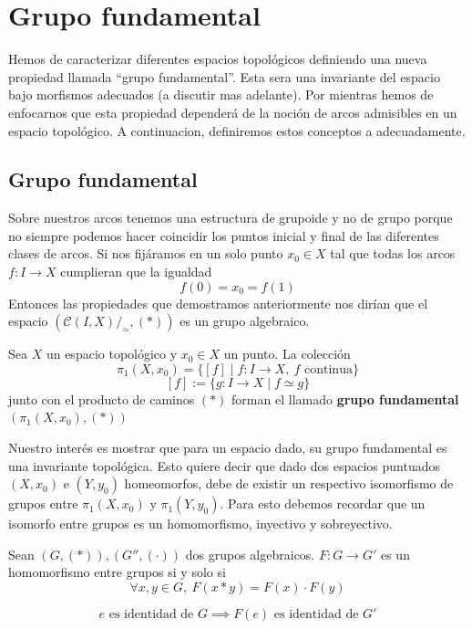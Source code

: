 \section{Grupo fundamental}
Hemos de caracterizar diferentes espacios topológicos definiendo una
nueva propiedad llamada ``grupo fundamental''. Esta sera una invariante
del espacio bajo morfismos adecuados (a discutir mas adelante). Por
mientras hemos de enfocarnos que esta propiedad dependerá de la noción
de arcos admisibles en un espacio topológico. A continuacion,
definiremos estos conceptos a adecuadamente.

{
\newcommand{\homRelAlt}{\stackrel{.}{\simeq}}



\subsection{Grupo fundamental}
Sobre nuestros arcos tenemos una estructura de grupoide y no de grupo
porque no siempre podemos hacer coincidir los puntos inicial y final de
las diferentes clases de arcos. Si nos fijáramos en un solo punto \(x_0
\in X\) tal que todas los arcos \(f : I \to X\) cumplieran que la igualdad
\[ f(0) = x_0 = f (1) \]
Entonces las propiedades que demostramos anteriormente nos dirían que el
espacio \((\mathcal C \left( I , X \right) / _\simeq , \left( *
\right))\) es un grupo algebraico.
\begin{definicion}
  Sea \(X\) un espacio topológico y \(x_0 \in X\) un punto. La colección
  \[ \pi_1 (X,x_0) = \{ [f] \mid f : I \to X,\ f \text{ continua}\}\]
  \[ [f] := \{ g : I \to X \mid f \simeq g\}\]
  junto con el producto de caminos \((*)\) forman el llamado
  \textbf{grupo fundamental} \((\pi_1(X,x_0), (*))\)
\end{definicion}

Nuestro interés es mostrar que para un espacio dado, su grupo
fundamental es una invariante topológica. Esto quiere decir que dado dos
espacios puntuados \((X,x_0)\) e \((Y,y_0)\) homeomorfos, debe de
existir un respectivo isomorfismo de grupos entre \(\pi_1(X,x_0)\) y
\(\pi_1(Y,y_0)\). Para esto debemos recordar que un isomorfo entre
grupos es un homomorfismo, inyectivo y sobreyectivo.
\begin{definicion}[Homomorfismo] \label{def:homomorfismo}
  Sean \((G,(*)), (G'', (\cdot))\) dos grupos algebraicos. \(F : G \to
  G'\) es un homomorfismo entre grupos si y solo si
  \[ \forall x,y \in G,\ F (x * y) = F(x) \cdot F(y)\]
\end{definicion}
\begin{corolario}
  \[ e \text{ es identidad de } G \implies F(e) \text { es identidad de } G' \]
\end{corolario}

}
